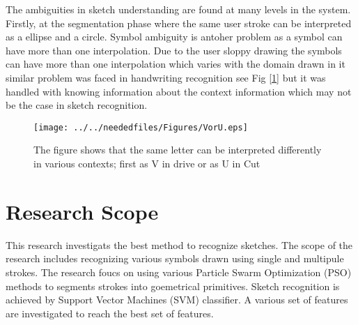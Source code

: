  The ambiguities in sketch understanding are found at many levels in the system. Firstly, at the segmentation phase where the same user stroke can be interpreted as a ellipse and a circle. Symbol ambiguity is antoher problem as a symbol can have more than one interpolation. Due to the user sloppy drawing the symbols can have more than one interpolation which varies with the domain drawn in it similar problem was faced in handwriting recognition see Fig [\ref{fig:VorU}] but it was handled with knowing information about the context information which may not be the case in sketch recognition. 
 
\begin{figure}	
	\centering
		\texttt{[image: ../../neededfiles/Figures/VorU.eps]}
	\caption[Ambiguities Handwriting ]{The figure shows that the same letter can be interpreted differently in various contexts; first as V in drive or as U in Cut}
\label{fig:VorU}
\end{figure} 	

\section{Research Scope}
 This research investigats the best method to recognize sketches. The scope of the research includes recognizing various symbols drawn using single and multipule strokes. The research foucs on using various Particle Swarm Optimization (PSO) methods to segments strokes into goemetrical primitives. Sketch recognition is achieved by  Support Vector Machines (SVM) classifier. A various set of features are investigated to reach the best set of features. 
 
 
 

